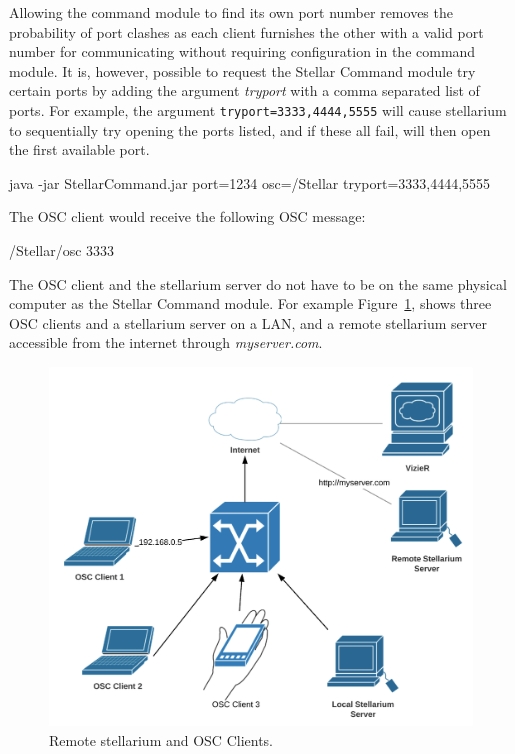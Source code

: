  
Allowing the command module to find its own port number removes the probability of port clashes as each client furnishes the other with a valid port number for communicating without requiring configuration in the command module. It is, however, possible to request the Stellar Command module try certain ports by adding the argument \textit{tryport} with a comma separated list of ports. For example, the argument \texttt{tryport=3333,4444,5555} will cause stellarium to sequentially try opening the ports listed, and if these all fail, will then open the first available port.\\
   
   \begin{syntax}
\medskip
   	java -jar StellarCommand.jar port=1234 osc=/Stellar  tryport=3333,4444,5555\\
\medskip
   \end{syntax}
   \bigskip
   
   The OSC client would receive the following OSC message:
   \begin{syntax}
   	/Stellar/osc 3333  \\
   \end{syntax}
   \bigskip
   
The OSC client and the stellarium server do not have to be on the same physical computer as the Stellar Command module. For example Figure~\ref{fig:RemoteStellarium}, shows three OSC clients and a stellarium server on a LAN, and a remote stellarium server accessible from the internet through \textit{myserver.com}.

\begin{figure}[htbp]
	\centering
	\includegraphics[width=1\columnwidth]{RemoteStellarium}
	\caption{Remote stellarium and OSC Clients.}
	\label{fig:RemoteStellarium}
\end{figure}
\bigskip


